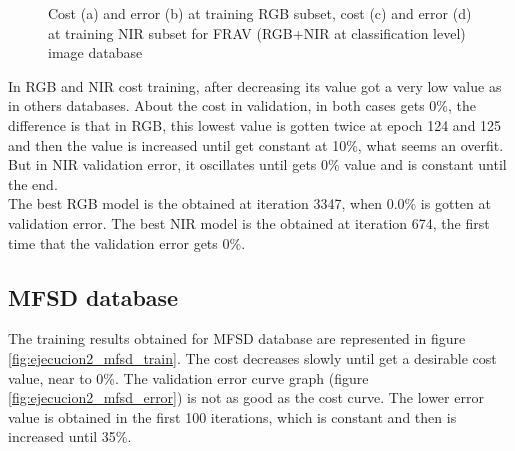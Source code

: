 \begin{figure}[htb]
\caption{Cost (a) and error (b) at training RGB subset, cost (c) and error (d) at training NIR subset for FRAV (RGB+NIR at classification level) image database}
\label{fig:ejecucion2_frav_clas_train}
\end{figure}

In RGB and NIR cost training, after decreasing its value got a very low value as in others databases. About the cost in validation, in both cases gets 0\%, the difference is that in RGB, this lowest value is gotten twice at epoch 124 and 125 and then the value is increased until get constant at 10\%, what seems an overfit. But in NIR validation error, it oscillates until gets 0\% value and is constant until the end.\\

The best RGB model is the obtained at iteration 3347, when 0.0\% is gotten at validation error. The best NIR model is the obtained at iteration 674, the first time that the validation error gets 0\%.\\

\subsection{MFSD database}
The training results obtained for MFSD database are represented in figure \ref{fig:ejecucion2_mfsd_train}. The cost decreases slowly until get a desirable cost value, near to 0\%. The validation error curve graph (figure \ref{fig:ejecucion2_mfsd_error}) is not as good as the cost curve. The lower error value is obtained in the first 100 iterations, which is constant and then is increased until 35\%.\\

